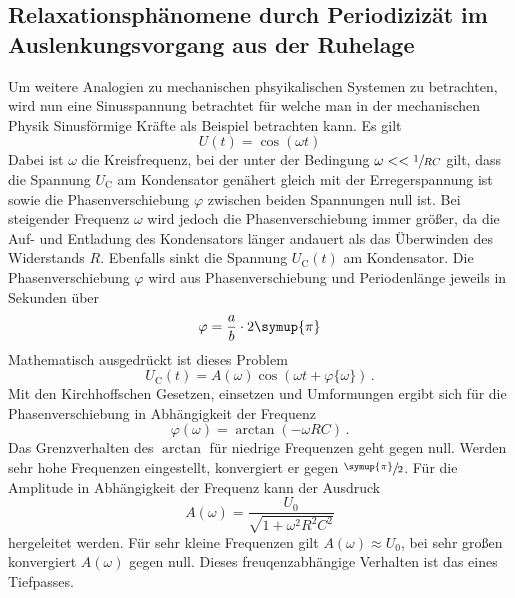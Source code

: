 \subsection{Relaxationsphänomene durch Periodizizät im Auslenkungsvorgang 
aus der Ruhelage}
Um weitere Analogien zu mechanischen phsyikalischen Systemen zu betrachten,
wird nun eine Sinusspannung betrachtet für welche man in der mechanischen 
Physik Sinusförmige Kräfte als Beispiel betrachten kann. Es gilt
\begin{equation}
    U(t)=\cos(\omega t)
\end{equation}
Dabei ist $\omega$ die Kreisfrequenz, bei der unter der Bedingung $\omega<<\sfrac{1}{RC}$
gilt, dass die Spannung $U_\text{C}$ am Kondensator genähert gleich mit der Erregerspannung ist
sowie die Phasenverschiebung $\varphi$ zwischen beiden Spannungen null ist.
Bei steigender Frequenz $\omega$ wird jedoch die Phasenverschiebung immer größer,
da die Auf- und Entladung des Kondensators länger andauert als das Überwinden des
Widerstands $R$. Ebenfalls sinkt die Spannung $U_\text{C}(t)$ am Kondensator.
Die Phasenverschiebung $\varphi$ wird aus Phasenverschiebung und Periodenlänge
jeweils in Sekunden über 
\begin{equation}
    \varphi=\frac{a}{b}\cdot2\symup{\pi}
    \label{eq:Phasenverschiebung}
\end{equation}
Mathematisch ausgedrückt ist dieses Problem 
\begin{equation}
    U_\text{C}(t)=A(\omega)\cos(\omega t+\varphi\{\omega\})\,.
\end{equation}
Mit den Kirchhoffschen Gesetzen, einsetzen und Umformungen ergibt sich für die Phasenverschiebung
in Abhängigkeit der Frequenz
\begin{equation}
    \varphi(\omega)=\arctan(-\omega RC)\,.
    \label{eq:arctan1}
\end{equation}
Das Grenzverhalten des $\arctan$ für niedrige Frequenzen geht gegen null.
Werden sehr hohe Frequenzen eingestellt, konvergiert er gegen $\sfrac{\symup{\pi}}{2}$.
Für die Amplitude in Abhängigkeit der Frequenz kann der Ausdruck
\begin{equation}
    A(\omega)=\frac{U_0}{\sqrt{1+\omega^2R^2C^2}}
    \label{eq:arctan}
\end{equation}
hergeleitet werden. Für sehr kleine Frequenzen gilt $A(\omega)\approx U_0$, bei sehr großen
konvergiert $A(\omega)$ gegen null. Dieses freuqenzabhängige Verhalten ist das eines
Tiefpasses.
